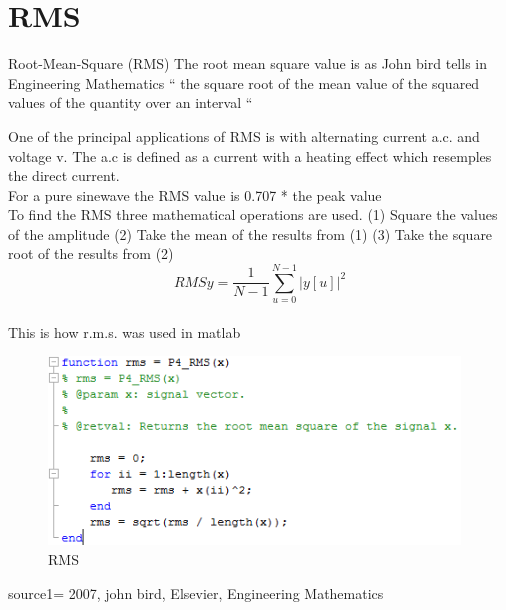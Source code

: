 \section{RMS}
Root-Mean-Square (RMS)
The root mean square value is as John bird tells in Engineering Mathematics \citep{Bird2007
} “ the square root of the mean value of the squared values of the quantity over an interval “

One of the principal applications of RMS is with alternating current a.c. and voltage v. The a.c is defined as a current with a heating effect which resemples the direct current. \citep{Bird2007}
\\
For a pure sinewave the RMS value is 0.707 * the peak value
\\
To find the RMS three mathematical operations are used.
(1)	Square the values of the amplitude
(2)	Take the mean of the results from (1)
(3)	Take the square root of the results from (2)
\begin{equation}\label{eq:RMS formular}
RMSy = \frac{1}{N-1}\sum_{u=0}^{N-1}|y[u]|^2
\end{equation}
\\
This is how r.m.s. was used in matlab
\begin{figure}
	\begin{center}
		\includegraphics[height=5cm]{fig/RMS_matlabCode.png}
		\caption{RMS}
	\end{center}
\end{figure}

source1= 2007, john bird, Elsevier, Engineering Mathematics